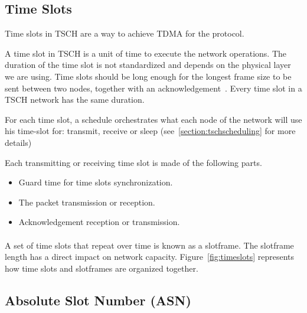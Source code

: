 %


\subsection{Time Slots}

Time slots in TSCH are a way to achieve TDMA for the protocol.

A time slot in TSCH is a unit of time to execute the network operations.
The duration of the time slot is not standardized and depends on the physical
layer we are using.
Time slots should be long enough for the longest frame size to be sent
between two nodes, together with an acknowledgement~\cite{rfc7554}.
Every time slot in a TSCH network has the same duration.

For each time slot, a schedule orchestrates what each
node of the network will use his time-slot for: transmit, receive or sleep
(see~\ref{section:tschscheduling} for more details)

Each transmitting or receiving time slot is made of the following parts.

\begin{itemize}
  \item Guard time for time slots synchronization.
  \item The packet transmission or reception.
  \item Acknowledgement reception or transmission.
\end{itemize}

\paragraph{}

A set of time slots that repeat over time is known as a slotframe.
The slotframe length has a direct impact on network capacity.
Figure~\ref{fig:timeslots} represents how time slots and slotframes are
organized together.



\subsection{Absolute Slot Number (ASN)}


